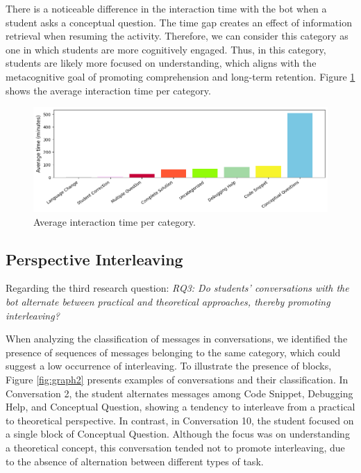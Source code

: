 \documentclass[a4paper,twoside]{article}
\begin{document}
There is a noticeable difference in the interaction time with the bot when a
student asks a conceptual question. The time gap creates an effect of
information retrieval when resuming the activity. Therefore, we can consider
this category as one in which students are more cognitively engaged. Thus, in
this category, students are likely more focused on understanding, which aligns
with the metacognitive goal of promoting comprehension and long-term retention.
Figure \ref{fig:graph3} shows the average interaction time per category.

\begin{figure}[htbp]
  \centering
  \includegraphics[scale=0.55]{img/figure3.png}
  \caption{Average interaction time per category.}
  \label{fig:graph3}
\end{figure}

\subsection{Perspective Interleaving}


Regarding the third research question: \textit{RQ3: Do students' conversations
with the bot alternate between practical and theoretical approaches, thereby
promoting interleaving?}

When analyzing the classification of messages in conversations, we identified
the presence of sequences of messages belonging to the same category, which
could suggest a low occurrence of interleaving. To illustrate the presence of
blocks, Figure \ref{fig:graph2} presents examples of conversations and their
classification. In Conversation 2, the student alternates messages among Code
Snippet, Debugging Help, and Conceptual Question, showing a tendency to
interleave from a practical to theoretical perspective. In contrast, in
Conversation 10, the student focused on a single block of Conceptual Question.
Although the focus was on understanding a theoretical concept, this conversation
tended not to promote interleaving, due to the absence of alternation between
different types of task.
\end{document}
